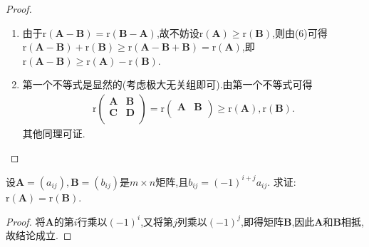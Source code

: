 \documentclass[../../main.tex]{subfiles}
\begin{document}
\begin{proof}
\begin{enumerate}[(1)]
\item 由于\(\mathrm{r}(\boldsymbol{A}-\boldsymbol{B})=\mathrm{r}(\boldsymbol{B}-\boldsymbol{A})\),故不妨设\(\mathrm{r}(\boldsymbol{A})\geqslant \mathrm{r}(\boldsymbol{B})\),则由(6)可得\(\mathrm{r}(\boldsymbol{A}-\boldsymbol{B})+\mathrm{r}(\boldsymbol{B})\geqslant \mathrm{r}(\boldsymbol{A}-\boldsymbol{B}+\boldsymbol{B})=\mathrm{r}(\boldsymbol{A})\),即\(\mathrm{r}(\boldsymbol{A}-\boldsymbol{B})\geqslant \mathrm{r}(\boldsymbol{A})-\mathrm{r}(\boldsymbol{B})\).

\item 第一个不等式是显然的(考虑极大无关组即可).由第一个不等式可得
\begin{align*}
\mathrm{r}\left( \begin{matrix}
\boldsymbol{A}&		\boldsymbol{B}\\
\boldsymbol{C}&		\boldsymbol{D}\\
\end{matrix} \right) =\mathrm{r}\left( \begin{matrix}
\boldsymbol{A}&		\boldsymbol{B}\\
\end{matrix} \right) \geqslant \mathrm{r}\left( \boldsymbol{A} \right) ,\mathrm{r}\left( \boldsymbol{B} \right) .
\end{align*}
其他同理可证.
\end{enumerate}
\end{proof}

\begin{example}
设\(\boldsymbol{A}=(a_{ij}),\boldsymbol{B}=(b_{ij})\)是\(m\times n\)矩阵,且\(b_{ij}=(-1)^{i + j}a_{ij}\). 求证:\(\mathrm{r}(\boldsymbol{A})=\mathrm{r}(\boldsymbol{B})\).
\end{example}
\begin{proof}
将\(\boldsymbol{A}\)的第\(i\)行乘以\((-1)^i\),又将第\(j\)列乘以\((-1)^j\),即得矩阵\(\boldsymbol{B}\),因此\(\boldsymbol{A}\)和\(\boldsymbol{B}\)相抵,故结论成立. 
\end{proof}
\end{document}
